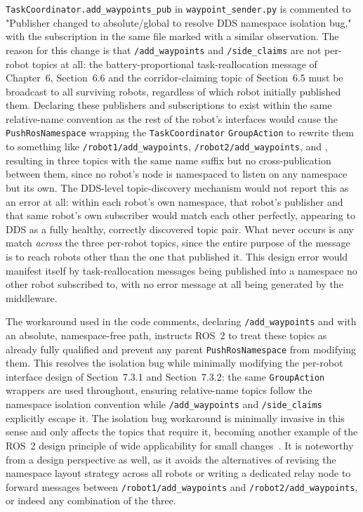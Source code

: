 \texttt{TaskCoordinator.add\_waypoints\_pub} in \texttt{waypoint\_sender.py} is commented to "Publisher changed to absolute/global to resolve DDS namespace isolation bug," with the subscription in the same file marked with a similar observation. The reason for this change is that \texttt{/add\_waypoints} and \texttt{/side\_claims} are not per-robot topics at all: the battery-proportional task-reallocation message of Chapter~6, Section~6.6 and the corridor-claiming topic of Section~6.5 must be broadcast to all surviving robots, regardless of which robot initially published them. Declaring these publishers and subscriptions to exist within the same relative-name convention as the rest of the robot's interfaces would cause the \texttt{PushRosNamespace} wrapping the \texttt{TaskCoordinator} \texttt{GroupAction} to rewrite them to something like \texttt{/robot1/add\_waypoints}, \texttt{/robot2/add\_waypoints}, and , resulting in three topics with the same name suffix but no cross-publication between them, since no robot's node is namespaced to listen on any namespace but its own. The DDS-level topic-discovery mechanism would not report this as an error at all: within each robot's own namespace, that robot's publisher and that same robot's own subscriber would match each other perfectly, appearing to DDS as a fully healthy, correctly discovered topic pair. What never occurs is any match \emph{across} the three per-robot topics, since the entire purpose of the message is to reach robots other than the one that published it. This design error would manifest itself by task-reallocation messages being published into a namespace no other robot subscribed to, with no error message at all being generated by the middleware.

The workaround used in the code comments, declaring \texttt{/add\_waypoints} and  with an absolute, namespace-free path, instructs ROS~2 to treat these topics as already fully qualified and prevent any parent \texttt{PushRosNamespace} from modifying them. This resolves the isolation bug while minimally modifying the per-robot interface design of Section~7.3.1 and Section~7.3.2: the same \texttt{GroupAction} wrappers are used throughout, ensuring relative-name topics follow the namespace isolation convention while \texttt{/add\_waypoints} and \texttt{/side\_claims} explicitly escape it. The isolation bug workaround is minimally invasive in this sense and only affects the topics that require it, becoming another example of the ROS~2 design principle of wide applicability for small changes~\cite{macenski2022robot}. It is noteworthy from a design perspective as well, as it avoids the alternatives of revising the namespace layout strategy across all robots or writing a dedicated relay node to forward messages between \texttt{/robot1/add\_waypoints} and \texttt{/robot2/add\_waypoints}, or indeed any combination of the three.

